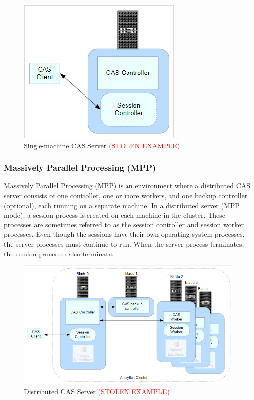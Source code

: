 \begin{figure}[H]
    \centering
    \includegraphics[scale = 0.8]{images/smp_server.png}
    \caption{Single-machine CAS Server \textcolor{red}{(STOLEN EXAMPLE)} }
    \label{SMP Achitecture}
\end{figure}

\subsubsection{Massively Parallel Processing (MPP)}
Massively Parallel Processing (MPP) is an environment where a distributed CAS server consists of one controller, one or more workers, and one backup controller (optional), each running on a separate machine. In a distributed server (MPP mode), a session process is created on each machine in the cluster. These processes are sometimes referred to as the session controller and session worker processes. Even though the sessions have their own operating system processes, the server processes must continue to run. When the server process terminates, the session processes also terminate.

\begin{figure}[H]
    \centering
    \includegraphics[scale = 0.8]{images/mpp_server.png}
    \caption{Distributed CAS Server \textcolor{red}{(STOLEN EXAMPLE)} }
    \label{MMP Architecture}
\end{figure}

